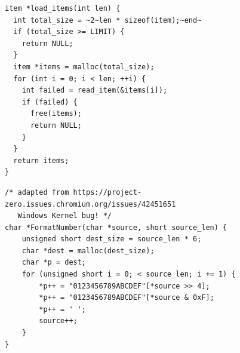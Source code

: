 \documentclass[tikz]{standalone}
\begin{document}
\begin{lrbox}{\overExampleACode}
\begin{lstlisting}
item *load_items(int len) {
  int total_size = ~2~len * sizeof(item);~end~
  if (total_size >= LIMIT) {
    return NULL;
  }
  item *items = malloc(total_size);
  for (int i = 0; i < len; ++i) {
    int failed = read_item(&items[i]);
    if (failed) {
      free(items);
      return NULL;
    }
  }
  return items;
}
\end{lstlisting}
\end{lrbox}
\begin{lrbox}{\overExampleBCode}
\begin{lstlisting}
/* adapted from https://project-zero.issues.chromium.org/issues/42451651 
   Windows Kernel bug! */
char *FormatNumber(char *source, short source_len) {
    unsigned short dest_size = source_len * 6;
    char *dest = malloc(dest_size);
    char *p = dest;
    for (unsigned short i = 0; < source_len; i += 1) {
        *p++ = "0123456789ABCDEF"[*source >> 4];
        *p++ = "0123456789ABCDEF"[*source & 0xF];
        *p++ = ' ';
        source++;
    }
}

\end{lstlisting}
\end{lrbox}


\end{document}

